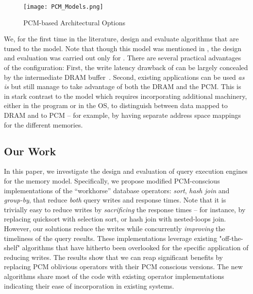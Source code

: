 \begin{figure}[htbp]
	\texttt{[image: PCM\_Models.png]}\centering
	\caption{PCM-based Architectural Options}
	\label{fig:pcm_models}
\end{figure}
 
We, for the first time in the literature, design and evaluate algorithms
that are tuned to the \model{} model. Note that though this model was mentioned in
\cite{chen}, the design and evaluation was carried out only for \modelPcmRam{}.
There are several practical advantages of the \model{} configuration:
First, the write latency drawback of \modelPcmRam{} can be largely
concealed by the intermediate DRAM buffer~\cite{qureshi}. Second,
existing applications can be used \textit{as is} but still manage to take
advantage of both the DRAM and the PCM. This is in stark contrast to the
\modelExplicit{} model which requires incorporating additional machinery,
either in the program or in the OS, to distinguish between data mapped
to DRAM and to PCM -- for example, by having separate address space
mappings for the different memories.

\subsection*{Our Work}

\begin{comment}
In this paper, we investigate the design and evaluation of query execution
engines for the \model{} memory model.  Specifically, we propose modified
PCM-conscious implementations of the ``workhorse'' database operators:
\textit{sort}, \textit{hash join} and \textit{group-by}, that reduce
\emph{both} query writes and response times. Note that it is trivially
easy to reduce writes by \emph{sacrificing} the response times --
for instance, by replacing quicksort with selection sort, or hash join
with nested-loops join. However, our solutions reduce the writes while
concurrently \emph{improving} the timeliness of the query results.
\end{comment}

In this paper, we investigate the design and evaluation of query execution
engines for the \model{} memory model.  Specifically, we propose modified
PCM-conscious implementations of the ``workhorse'' database operators:
\textit{sort}, \textit{hash join} and \textit{group-by}, that reduce
\emph{both} query writes and response times.  Note that it is trivially
easy to reduce writes by \emph{sacrificing} the response times --
for instance, by replacing quicksort with selection sort, or hash join
with nested-loops join. However, our solutions reduce the writes while
concurrently \emph{improving} the timeliness of the query results. These implementations leverage existing "off-the-shelf" algorithms that have hitherto been overlooked for the specific application of reducing writes. The results show that we can reap significant benefits by replacing PCM oblivious operators with their PCM conscious versions. The new algorithms share most of the code with existing operator implementations indicating their ease of incorporation in existing systems.



